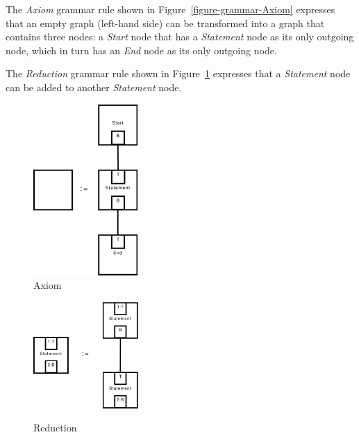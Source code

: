The \emph{Axiom} grammar rule shown in Figure~\ref{figure-grammar-Axiom}
expresses that an empty graph (left-hand side) can be transformed into a
graph that contains three nodes: a \emph{Start} node that has a
\emph{Statement} node as its only outgoing node, which in turn has an
\emph{End} node as its only outgoing node.

The \emph{Reduction} grammar rule shown in
Figure~\ref{figure-grammar-Reduction} expresses that a \emph{Statement} node
can be added to another \emph{Statement} node.

\begin{figure}[htb]
  \begin{minipage}{0.45\textwidth}
    \begin{center}
      \includegraphics[width=4cm]{figures/grammar/axiom}\\[5mm]
      \caption[The \emph{Axiom} grammar rule]{Axiom}
      \label{figure-grammar-Axiom}
    \end{center}
  \end{minipage}
  \hfill
  \begin{minipage}{0.45\textwidth}
    \begin{center}
      \includegraphics[width=4cm]{figures/grammar/reduction}\\[5mm]
      \caption[The \emph{Reduction} grammar rule]{Reduction}
      \label{figure-grammar-Reduction}
    \end{center}
  \end{minipage}
\end{figure}

